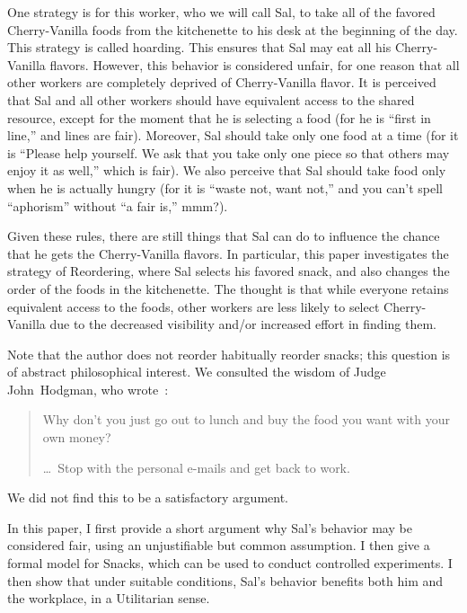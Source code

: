 \documentclass[twocolumn]{article}
\begin{document}
One strategy is for this worker, who we will call Sal, to take all of the favored Cherry-Vanilla foods from the kitchenette to his desk at the beginning of the day. This strategy is called hoarding. This ensures that Sal may eat all his Cherry-Vanilla flavors. However, this behavior is considered unfair, for one reason that all other workers are completely deprived of Cherry-Vanilla flavor. It is perceived that Sal and all other workers should have equivalent access to the shared resource, except for the moment that he is selecting a food (for he is ``first in line,'' and lines are fair). Moreover, Sal should take only one food at a time (for it is ``Please help yourself. We ask that you take only one piece so that others may enjoy it as well,'' which is fair). We also perceive that Sal should take food only when he is actually hungry (for it is ``waste not, want not,'' and you can't spell ``aphorism'' without ``a fair is,'' mmm?).

Given these rules, there are still things that Sal can do to influence the chance that he gets the Cherry-Vanilla flavors. In particular, this paper investigates the strategy of Reordering, where Sal selects his favored snack, and also changes the order of the foods in the kitchenette. The thought is that while everyone retains equivalent access to the foods, other workers are less likely to select Cherry-Vanilla due to the decreased visibility and/or increased effort in finding them.

Note that the author does not reorder habitually reorder snacks; this question is of abstract philosophical interest. We consulted the wisdom of Judge John~Hodgman, who wrote~\cite{hodgman2016snacks}:

\begin{quotation}
  \noindent Why don't you just go out to lunch and buy the food you want with
  your own money?
  
  \noindent \ldots\ Stop with the personal e-mails and get back to work.
\end{quotation}

We did not find this to be a satisfactory argument.

\smallskip
In this paper, I first provide a short argument why Sal's behavior may be considered fair, using an unjustifiable but common assumption. I then give a formal model for Snacks, which can be used to conduct controlled experiments. I then show that under suitable conditions, Sal's behavior benefits both him and the workplace, in a Utilitarian sense.
\end{document}
